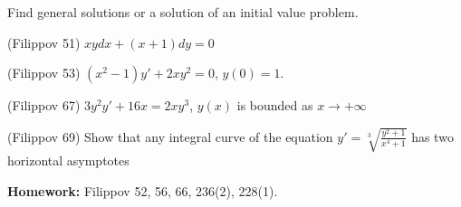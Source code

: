 \documentclass[14pt]{exam}
\begin{document}
\begin{questions}
	\end{questions}
	
	Find general solutions or a solution of an initial value problem.
	
	\begin{questions}
		\setcounter{question}{3}
		\question
		(Filippov 51) $xy dx + (x+1)dy = 0$
		
		\question
		(Filippov 53) $(x^2 - 1)y' + 2xy^2 = 0$, $y(0) = 1$.
		
		\question
		(Filippov 67)
		$3y^2y' + 16x = 2xy^3$, $y(x)$ is bounded as $x\to+\infty$
		
		\question
		(Filippov 69)
		Show that any integral curve of the equation $y' = \sqrt[3]{\frac{y^2 + 1}{x^4 + 1}}$ has two horizontal asymptotes
	\end{questions}
	
	\textbf{Homework:} Filippov 52, 56, 66, 236(2), 228(1).
\end{document}
